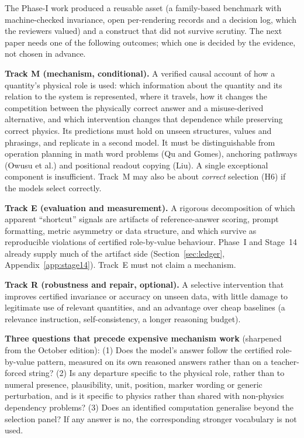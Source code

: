 \documentclass[10pt,a4paper]{article}
\begin{document}
The Phase-I work produced a reusable asset (a family-based benchmark with machine-checked invariance, open
per-rendering records and a decision log, which the reviewers valued) and a construct that did not survive
scrutiny. The next paper needs one of the following outcomes; which one is decided by the evidence, not chosen in
advance.

\textbf{Track M (mechanism, conditional).} A verified causal account of how a quantity's physical role is used:
which information about the quantity and its relation to the system is represented, where it travels, how it
changes the competition between the physically correct answer and a misuse-derived alternative, and which
intervention changes that dependence while preserving correct physics. Its predictions must hold on unseen
structures, values and phrasings, and replicate in a second model. It must be distinguishable from operation
planning in math word problems (Qu and Gomes), anchoring pathways (Owusu et al.) and positional readout copying
(Liu). A single exceptional component is insufficient. Track~M may also be about \emph{correct} selection (H6) if
the models select correctly.

\textbf{Track E (evaluation and measurement).} A rigorous decomposition of which apparent ``shortcut'' signals are
artifacts of reference-answer scoring, prompt formatting, metric asymmetry or data structure, and which survive
as reproducible violations of certified role-by-value behaviour. Phase~I and Stage~14 already supply much of the
artifact side (Section~\ref{sec:ledger}, Appendix~\ref{app:stage14}). Track~E must not claim a mechanism.

\textbf{Track R (robustness and repair, optional).} A selective intervention that improves certified invariance
or accuracy on unseen data, with little damage to legitimate use of relevant quantities, and an advantage over
cheap baselines (a relevance instruction, self-consistency, a longer reasoning budget).

\textbf{Three questions that precede expensive mechanism work} (sharpened from the October edition): (1) Does the
model's answer follow the certified role-by-value pattern, measured on its own reasoned answers rather than on a
teacher-forced string? (2) Is any departure specific to the physical role, rather than to numeral presence,
plausibility, unit, position, marker wording or generic perturbation, and is it specific to physics rather than
shared with non-physics dependency problems? (3) Does an identified computation generalise beyond the selection
panel? If any answer is no, the corresponding stronger vocabulary is not used.
\end{document}
